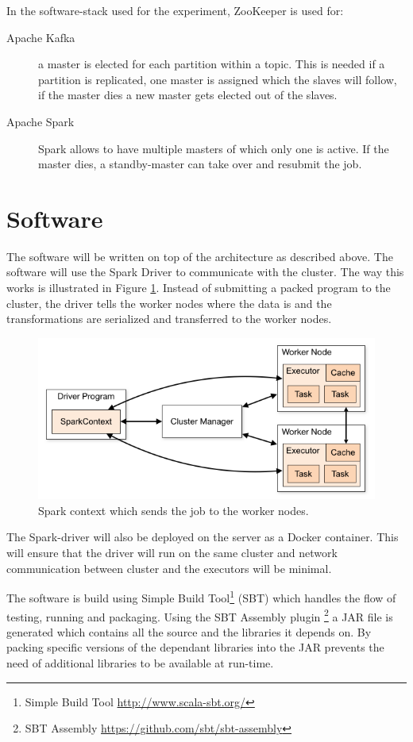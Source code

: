 In the software-stack used for the experiment, ZooKeeper is used for:
\begin{description} 
    \item[Apache Kafka] a master is elected for each partition within a topic. This is needed if a partition is replicated, one master is assigned which the slaves will follow, if the master dies a new master gets elected out of the slaves. 
    \item[Apache Spark] Spark allows to have multiple masters of which only one is active. If the master dies, a standby-master can take over and resubmit the job.
\end{description}

\section{Software}

The software will be written on top of the architecture as described above. The software will use the Spark Driver to communicate with the cluster. The way this works is illustrated in Figure \ref{fig:driver}. Instead of submitting a packed program to the cluster, the driver tells the worker nodes where the data is and the transformations are serialized and transferred to the worker nodes.

\begin{figure}[ht!]
\centering
\includegraphics[width=\textwidth]{figures/clusterdriver.png}
\caption{Spark context which sends the job to the worker nodes. \label{fig:driver}}
\end{figure}

The Spark-driver will also be deployed on the server as a Docker container. This will ensure that the driver will run on the same cluster and network communication between cluster and the executors will be minimal.

The software is build using Simple Build Tool\footnote{Simple Build Tool \url{http://www.scala-sbt.org/}} (SBT) which handles the flow of testing, running and packaging. Using the SBT Assembly plugin \footnote{SBT Assembly \url{https://github.com/sbt/sbt-assembly}} a JAR file is generated which contains all the source and the libraries it depends on. By packing specific versions of the dependant libraries into the JAR prevents the need of additional libraries to be available at run-time.

